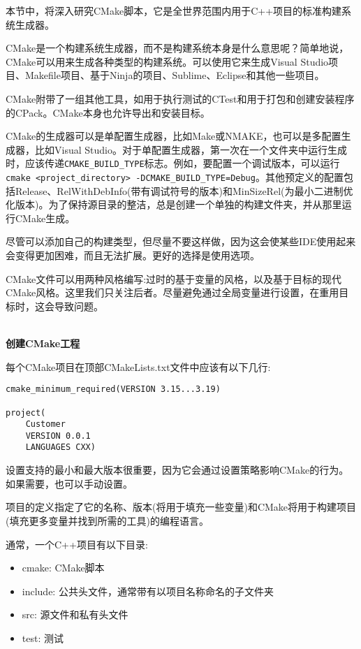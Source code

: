 
本节中，将深入研究CMake脚本，它是全世界范围内用于C++项目的标准构建系统生成器。


CMake是一个构建系统生成器，而不是构建系统本身是什么意思呢？简单地说，CMake可以用来生成各种类型的构建系统。可以使用它来生成Visual Studio项目、Makefile项目、基于Ninja的项目、Sublime、Eclipse和其他一些项目。

CMake附带了一组其他工具，如用于执行测试的CTest和用于打包和创建安装程序的CPack。CMake本身也允许导出和安装目标。

CMake的生成器可以是单配置生成器，比如Make或NMAKE，也可以是多配置生成器，比如Visual Studio。对于单配置生成器，第一次在一个文件夹中运行生成时，应该传递\texttt{CMAKE\_BUILD\_TYPE}标志。例如，要配置一个调试版本，可以运行\texttt{cmake <project\_directory> -DCMAKE\_BUILD\_TYPE=Debug}。其他预定义的配置包括Release、RelWithDebInfo(带有调试符号的版本)和MinSizeRel(为最小二进制优化版本)。为了保持源目录的整洁，总是创建一个单独的构建文件夹，并从那里运行CMake生成。

尽管可以添加自己的构建类型，但尽量不要这样做，因为这会使某些IDE使用起来会变得更加困难，而且无法扩展。更好的选择是使用选项。

CMake文件可以用两种风格编写:过时的基于变量的风格，以及基于目标的现代CMake风格。这里我们只关注后者。尽量避免通过全局变量进行设置，在重用目标时，这会导致问题。

\hspace*{\fill} \\ %
\noindent
\textbf{创建CMake工程}

每个CMake项目在顶部CMakeLists.txt文件中应该有以下几行:

\begin{lstlisting}[style=styleCMake]
cmake_minimum_required(VERSION 3.15...3.19)

project(
	Customer
	VERSION 0.0.1
	LANGUAGES CXX)
\end{lstlisting}

设置支持的最小和最大版本很重要，因为它会通过设置策略影响CMake的行为。如果需要，也可以手动设置。

项目的定义指定了它的名称、版本(将用于填充一些变量)和CMake将用于构建项目(填充更多变量并找到所需的工具)的编程语言。

通常，一个C++项目有以下目录:

\begin{itemize}
\item 
cmake: CMake脚本

\item 
include: 公共头文件，通常带有以项目名称命名的子文件夹

\item 
src: 源文件和私有头文件

\item 
test: 测试
\end{itemize}

